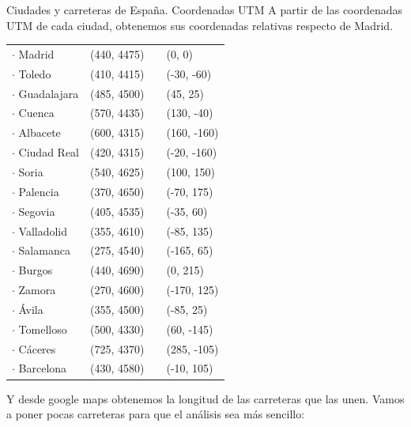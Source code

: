 \documentclass[11pt, a4paper, spanish, openright, twoside]{book}
\begin{document}
	\begin{section}{Ciudades y carreteras de España. Coordenadas UTM}
		A partir de las coordenadas UTM de cada ciudad, obtenemos sus coordenadas relativas respecto de Madrid.
		
		\begin{tabular}{llll}
		 $\cdot$ Madrid &	(440, 4475)		&\textrightarrow&	(0, 0) \\
		 $\cdot$ Toledo &	(410, 4415)		&\textrightarrow&	(-30, -60)\\
		$\cdot$ Guadalajara	& (485, 4500)	&\textrightarrow&	(45, 25)\\
		$\cdot$  Cuenca &	(570,  4435)	&	\textrightarrow &	(130, -40)\\
		 $\cdot$ Albacete	&(600, 4315) &	\textrightarrow&	(160, -160)\\
		 $\cdot$ Ciudad Real &	(420, 4315)&	\textrightarrow &	(-20, -160)\\
		$\cdot$  Soria&	(540, 4625)	&	\textrightarrow &	(100, 150)\\
		$\cdot$  Palencia&	(370, 4650)&  	\textrightarrow	& (-70, 175)\\
		$\cdot$  Segovia&	(405, 4535)&	\textrightarrow	& (-35, 60)\\
		$\cdot$  Valladolid&	(355, 4610)&	\textrightarrow	& (-85, 135)\\
		$\cdot$  Salamanca&	(275, 4540)&	\textrightarrow	& (-165, 65)\\
		$\cdot$  Burgos&	(440, 4690)		& \textrightarrow	& (0, 215)\\
		$\cdot$  Zamora & 	(270, 4600)	&	\textrightarrow	& (-170, 125)\\
		 $\cdot$ Ávila	& (355, 4500) &		\textrightarrow& 	(-85, 25)\\
		$\cdot$  Tomelloso &	(500, 4330) & 	\textrightarrow	 & (60, -145)\\
		$\cdot$ Cáceres & (725, 4370)	&	\textrightarrow	&(285, -105)\\	
		$\cdot$ Barcelona & (430, 4580)	& \textrightarrow	& (-10, 105)\\
		
		\end{tabular}

		Y desde google maps obtenemos la longitud de las carreteras que las unen. Vamos a poner pocas carreteras para que el análisis sea más sencillo:


\end{section}
\end{document}

